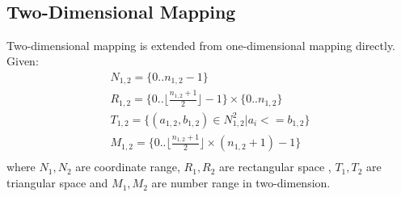 \documentclass[AMA,LATO1COL]{WileyNJD-v2-bak}
\begin{document}
\begin{table}[!ht]
  \centering
  \\
  \caption{Example: Interval Transformation for even/odd number of points }\label{maptable}
\end{table}

\subsection{Two-Dimensional Mapping}
Two-dimensional mapping is extended from one-dimensional mapping directly.
\\Given:
\begin{eqnarray}
& N_{1,2} = \{0..n_{1,2}-1\}          & \\
& R_{1,2} = \{0..\lfloor \frac{n_{1,2}+1}{2}\rfloor-1\} \times \{0..n_{1,2}\}&\\
& T_{1,2} = \{(a_{1,2},b_{1,2}) \in  N_{1,2}^2 | a_i<=b_{1,2}\}&\\
& M_{1,2} = \{0.. \lfloor \frac{n_{1,2}+1}{2}\rfloor \times (n_{1,2}+1)-1\}&\\
\end{eqnarray}
where $N_1,N_2$ are coordinate range, $R_1, R_2$ are rectangular space , $T_1,T_2$ are triangular space  and $M_1,M_2$ are number range in two-dimension.\\
\end{document}
